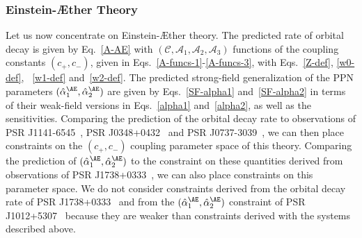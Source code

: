 \documentclass[prd,aps,twocolumn,nofootinbib,showpacs,superscriptaddress]{revtex4-1}
\begin{document}
\subsubsection{Einstein-\AE ther Theory}

Let us now concentrate on Einstein-\AE ther theory. The predicted rate of orbital decay is given by Eq.~\eqref{A-AE} with $(\mathcal{C},\mathcal{A}_{1},\mathcal{A}_{2},\mathcal{A}_{3})$ functions of the coupling constants $(c_{+},c_{-})$, given in Eqs.~\eqref{A-funcs-1}-\eqref{A-funcs-3}, with Eqs.~\eqref{Z-def}, \eqref{w0-def}, ~\eqref{w1-def} and~\eqref{w2-def}. The predicted strong-field generalization of the PPN parameters $(\hat{\alpha}_{1}^{\AE},\hat{\alpha}_{2}^{\AE})$ are given by Eqs.~\eqref{SF-alpha1} and~\eqref{SF-alpha2} in terms of their weak-field versions in Eqs.~\eqref{alpha1} and~\eqref{alpha2}, as well as the sensitivities. Comparing the prediction of the orbital decay rate to observations of PSR J1141-6545~\cite{bhat}, PSR J0348+0432~\cite{2.01NS} and PSR J0737-3039~\cite{kramer-double-pulsar}, we can then place constraints on the $(c_{+},c_{-})$ coupling parameter space of this theory. Comparing the prediction of $(\hat{\alpha}_{1}^{\AE},\hat{\alpha}_{2}^{\AE})$ to the constraint on these 
quantities derived from observations of PSR J1738+0333~\cite{freire}, we can also place constraints on this parameter space. We do not consider constraints derived from the orbital decay rate of PSR J1738+0333~\cite{freire} and from the $(\hat{\alpha}_{1}^{\AE},\hat{\alpha}_{2}^{\AE})$ constraint of PSR J1012+5307~\cite{Tauris:1994id} because they are weaker than constraints derived with the systems described above.
\end{document}
